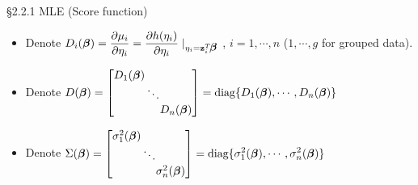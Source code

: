 \documentclass{beamer}
\begin{document}
\begin{frame}{\S2.2.1 MLE (Score function)}

\begin{itemize}

\item
{\footnotesize Denote $\displaystyle D_i(\mbox{\boldmath $\beta$})=\frac{\partial \mu_i}{\partial\eta_i}
=\frac{\partial h(\eta_i)}{\partial\eta_i}\mid_{\eta_i=\textbf{z}_i^T\!\mbox{\boldmath $\beta$}}$\;
,
$i=1,\cdots, n$ ($1,\cdots, g$ for grouped data).}
\item
{\footnotesize Denote $\displaystyle D(\mbox{\boldmath $\beta$})=\left[\begin{array}{ccc}
\!\!\!D_1(\mbox{\boldmath $\beta$})\!\! & & \\
& \!\!\!\ddots\!\!\! & \\ & & \!\!\!D_n(\mbox{\boldmath $\beta$})\!\!\!\end{array}\right]=\mbox{diag}
\{D_1(\mbox{\boldmath $\beta$}), \cdots, D_n(\mbox{\boldmath $\beta$})\}$}
\item
{\footnotesize Denote $\displaystyle \Sigma(\mbox{\boldmath $\beta$})=\left[\begin{array}{ccc}
\!\!\!\sigma_1^2(\mbox{\boldmath $\beta$})\!\! & & \\
& \!\!\!\ddots\!\!\! & \\ & & \!\!\!\sigma_n^2(\mbox{\boldmath $\beta$})\!\!\!\end{array}\right]=\mbox{diag}
\{\sigma_1^2(\mbox{\boldmath $\beta$}), \cdots, \sigma_n^2(\mbox{\boldmath $\beta$})\}$}



\end{itemize}
\end{frame}
\end{document}
